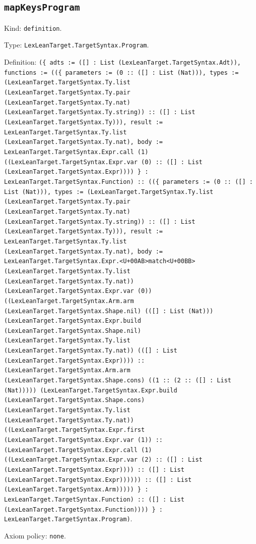 \documentclass[11pt]{article}
\begin{document}
\subsection*{\texttt{mapKeysProgram}}
\noindent Kind: \texttt{definition}.\par
\noindent Type: \texttt{LexLeanTarget.TargetSyntax.Program}.\par
\noindent Definition: \texttt{(\{ adts := ([] : List (LexLeanTarget.TargetSyntax.Adt)), functions := ((\{ parameters := (0 :: ([] : List (Nat))), types := (LexLeanTarget.TargetSyntax.Ty.list (LexLeanTarget.TargetSyntax.Ty.pair (LexLeanTarget.TargetSyntax.Ty.nat) (LexLeanTarget.TargetSyntax.Ty.string)) :: ([] : List (LexLeanTarget.TargetSyntax.Ty))), result := LexLeanTarget.TargetSyntax.Ty.list (LexLeanTarget.TargetSyntax.Ty.nat), body := LexLeanTarget.TargetSyntax.Expr.call (1) ((LexLeanTarget.TargetSyntax.Expr.var (0) :: ([] : List (LexLeanTarget.TargetSyntax.Expr)))) \} : LexLeanTarget.TargetSyntax.Function) :: ((\{ parameters := (0 :: ([] : List (Nat))), types := (LexLeanTarget.TargetSyntax.Ty.list (LexLeanTarget.TargetSyntax.Ty.pair (LexLeanTarget.TargetSyntax.Ty.nat) (LexLeanTarget.TargetSyntax.Ty.string)) :: ([] : List (LexLeanTarget.TargetSyntax.Ty))), result := LexLeanTarget.TargetSyntax.Ty.list (LexLeanTarget.TargetSyntax.Ty.nat), body := LexLeanTarget.TargetSyntax.Expr.<U+00AB>match<U+00BB> (LexLeanTarget.TargetSyntax.Ty.list (LexLeanTarget.TargetSyntax.Ty.nat)) (LexLeanTarget.TargetSyntax.Expr.var (0)) ((LexLeanTarget.TargetSyntax.Arm.arm (LexLeanTarget.TargetSyntax.Shape.nil) (([] : List (Nat))) (LexLeanTarget.TargetSyntax.Expr.build (LexLeanTarget.TargetSyntax.Shape.nil) (LexLeanTarget.TargetSyntax.Ty.list (LexLeanTarget.TargetSyntax.Ty.nat)) (([] : List (LexLeanTarget.TargetSyntax.Expr)))) :: (LexLeanTarget.TargetSyntax.Arm.arm (LexLeanTarget.TargetSyntax.Shape.cons) ((1 :: (2 :: ([] : List (Nat))))) (LexLeanTarget.TargetSyntax.Expr.build (LexLeanTarget.TargetSyntax.Shape.cons) (LexLeanTarget.TargetSyntax.Ty.list (LexLeanTarget.TargetSyntax.Ty.nat)) ((LexLeanTarget.TargetSyntax.Expr.first (LexLeanTarget.TargetSyntax.Expr.var (1)) :: (LexLeanTarget.TargetSyntax.Expr.call (1) ((LexLeanTarget.TargetSyntax.Expr.var (2) :: ([] : List (LexLeanTarget.TargetSyntax.Expr)))) :: ([] : List (LexLeanTarget.TargetSyntax.Expr)))))) :: ([] : List (LexLeanTarget.TargetSyntax.Arm))))) \} : LexLeanTarget.TargetSyntax.Function) :: ([] : List (LexLeanTarget.TargetSyntax.Function)))) \} : LexLeanTarget.TargetSyntax.Program)}.\par
\noindent Axiom policy: \texttt{none}.\par
\end{document}
